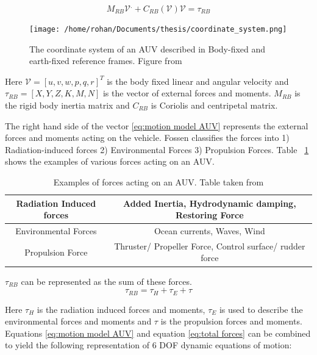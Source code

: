 \documentclass[12pt]{dalcsthesis}
\begin{document}
\begin{equation}
\label{eq:motion model AUV}
M_{RB}\mathcal{{V}}^{.}+C_{RB}(\mathcal{V})\mathcal{V}=\tau_{RB}
\end{equation}
\begin{figure}
  \centering
     {\texttt{[image: /home/rohan/Documents/thesis/coordinate\_system.png]}}
  \caption{\label{fig-Coordinate System} The coordinate system of an AUV described in Body-fixed and earth-fixed reference frames. Figure from \cite{Thor}
}
\end{figure}
Here $\mathcal{V}=[u,v,w,p,q,r]^{T}$ is the body fixed linear and angular velocity and $\tau_{RB}=[X,Y,Z,K,M,N]$ is the vector of external forces and moments. $M_{RB}$ is the rigid body inertia matrix and $C_{RB}$ is Coriolis and centripetal matrix. 

The right hand side of the vector \ref{eq:motion model AUV} represents the external forces and moments acting on the vehicle. Fossen \cite{Thor} classifies the forces into 1) Radiation-induced forces 2) Environmental Forces 3) Propulsion Forces. Table ~\ref{forces auv examples} shows the examples of various forces acting on an AUV.

\begin{table}[tbh]
\centering
\begin{tabular}{|c|c|}
\hline 
Radiation Induced forces & Added Inertia, Hydrodynamic damping, Restoring Force \\ 
\hline 
Environmental Forces & Ocean currents, Waves, Wind \\ 
\hline 
Propulsion Force & Thruster/ Propeller Force, Control surface/ rudder force \\ 
\hline 
\end{tabular} 
\caption{\label{forces auv examples}Examples of forces acting on an AUV. Table taken from \cite{Thor}}
\end{table}


$\tau_{RB}$ can be represented as the sum of these forces.
\begin{equation}
\label{eq:total forces}
 \tau_{RB} = \tau_{H} + \tau_{E} + \tau 
\end{equation}

Here $\tau_{H}$ is the radiation induced forces and moments, $\tau_{E}$ is used to describe the environmental forces and moments and $\tau$ is the propulsion forces and moments. Equations \ref{eq:motion model AUV} and equation \ref{eq:total forces} can be combined to yield the following representation of 6 DOF dynamic equations of motion:
 
\end{document}
